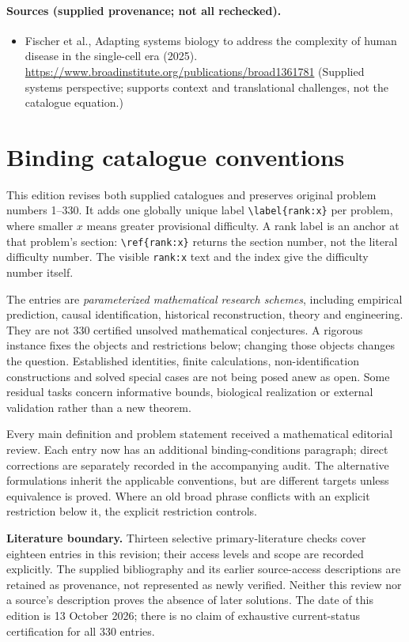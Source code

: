 \documentclass[11pt]{article}
\begin{document}
\paragraph{Sources (supplied provenance; not all rechecked).}
\begin{itemize}
\item Fischer et al., Adapting systems biology to address the complexity of human disease in the single-cell era (2025). \url{https://www.broadinstitute.org/publications/broad1361781} (Supplied systems perspective; supports context and translational challenges, not the catalogue equation.)
\end{itemize}


\section*{Binding catalogue conventions}
This edition revises both supplied catalogues and preserves original problem numbers 1--330. It adds one globally unique label \verb|\label{rank:x}| per problem, where smaller $x$ means greater provisional difficulty. A rank label is an anchor at that problem's section: \verb|\ref{rank:x}| returns the section number, not the literal difficulty number. The visible \texttt{rank:x} text and the index give the difficulty number itself.

The entries are \emph{parameterized mathematical research schemes}, including empirical prediction, causal identification, historical reconstruction, theory and engineering. They are not 330 certified unsolved mathematical conjectures. A rigorous instance fixes the objects and restrictions below; changing those objects changes the question. Established identities, finite calculations, non-identification constructions and solved special cases are not being posed anew as open. Some residual tasks concern informative bounds, biological realization or external validation rather than a new theorem.

Every main definition and problem statement received a mathematical editorial review. Each entry now has an additional binding-conditions paragraph; direct corrections are separately recorded in the accompanying audit. The alternative formulations inherit the applicable conventions, but are different targets unless equivalence is proved. Where an old broad phrase conflicts with an explicit restriction below it, the explicit restriction controls.

\textbf{Literature boundary.} Thirteen selective primary-literature checks cover eighteen entries in this revision; their access levels and scope are recorded explicitly. The supplied bibliography and its earlier source-access descriptions are retained as provenance, not represented as newly verified. Neither this review nor a source's description proves the absence of later solutions. The date of this edition is 13 October 2026; there is no claim of exhaustive current-status certification for all 330 entries.
\end{document}
